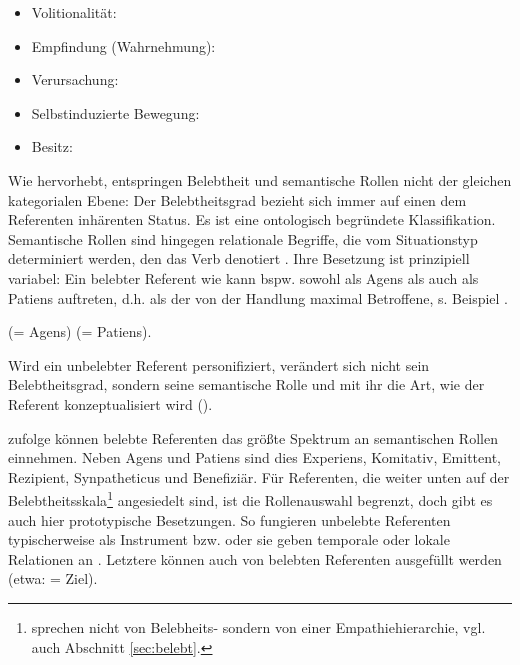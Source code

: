 \begin{itemize}
\item Volitionalität: 
\item Empfindung (Wahrnehmung):   
\item Verursachung:   
\item Selbstinduzierte Bewegung:  
\item Besitz: 
\end{itemize}

Wie \textcite[][151f.]{Yamamoto1999} hervorhebt, entspringen Belebtheit und semantische Rollen nicht der gleichen kategorialen Ebene: Der Belebtheitsgrad bezieht sich immer auf einen dem Referenten inhärenten Status. Es ist eine ontologisch begründete Klassifikation. Semantische Rollen sind hingegen relationale Begriffe, die vom Situationstyp determiniert werden, den das Verb denotiert \parencite[13]{Lehmann2004a}. Ihre Besetzung ist prinzipiell variabel: Ein belebter Referent wie  kann bspw. sowohl als Agens als auch als Patiens auftreten, d.h. als der von der Handlung maximal Betroffene, s. Beispiel . 
 
\begin{exe}
	\ex \label{ex:rollen}
	\begin{xlist}
	 	\ex {} (= Agens) 
		\ex {} (= Patiens).
 
	\end{xlist}
\end{exe}
\noindent
 
Wird ein unbelebter Referent personifiziert, verändert sich nicht sein Belebtheitsgrad, sondern seine semantische Rolle und mit ihr die Art, wie  der Referent konzeptualisiert wird (). 

\textcite[12]{Lehmann2004a} zufolge können belebte Referenten das größte Spektrum an semantischen Rollen einnehmen. Neben Agens und Patiens sind dies Experiens, Komitativ, Emittent, Rezipient, Synpatheticus und Benefiziär.  Für Referenten, die weiter unten auf der Belebtheitsskala\footnote{\textcite{Lehmann2004a} sprechen nicht von Belebheits- sondern von einer 
Empathiehierarchie, vgl. auch Abschnitt \ref{sec:belebt}.} angesiedelt sind, ist die Rollenauswahl begrenzt, doch gibt es auch hier prototypische Besetzungen. So fungieren unbelebte Referenten typischerweise als Instrument bzw.  oder sie geben temporale oder lokale Relationen an \parencite[76]{Primus2012}. Letztere können auch von belebten Referenten ausgefüllt werden (etwa:  = Ziel). 

